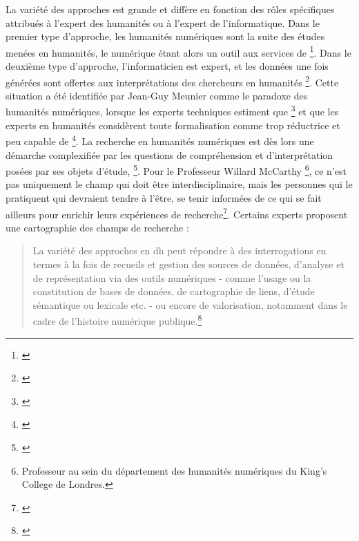 La variété des approches est grande et diffère en fonction des rôles spécifiques attribués à l'expert des humanités ou à l'expert de l'informatique. Dans le premier type d'approche, les humanités numériques sont la suite des études menées en humanités, le numérique étant alors un outil aux services de \textit{}\footnote{\cite[p.17]{schreibman_new_2016}}. Dans le deuxième type d'approche, l'informaticien est expert, et les données une fois générées sont offertes aux interprétations des chercheurs en humanités \footnote{\cite{meunier_paradoxe_2019}}. Cette situation a été identifiée par Jean-Guy Meunier comme le paradoxe des humanités numériques, lorsque les experts techniques estiment que \footnote{\cite[p.6]{meunier_paradoxe_2019}} et que les experts en humanités considèrent toute formalisation comme trop réductrice et peu capable de  \footnote{\cite[p.6]{meunier_paradoxe_2019}}. La recherche en humanités numériques est dès lors une démarche complexifiée par les questions de compréhension et d'interprétation posées par ses objets d'étude, \footnote{\cite[p.41]{clavert_les_2019}}. Pour le Professeur Willard McCarthy \footnote{Professeur au sein du département des humanités numériques du King's College de Londres.}, ce n'est pas uniquement le champ qui doit être interdisciplinaire, mais les personnes qui le pratiquent qui devraient tendre à l'être, se tenir informées de ce qui se fait ailleurs pour enrichir leurs expériences de recherche\footnote{\cite{schreibman_new_2016}}. Certains experts proposent une cartographie des champs de recherche : 

\begin{quotation}La variété des approches en \gls{dh} peut répondre à des interrogations en termes à la fois de recueils et gestion des sources de données, d'analyse et de représentation via des outils numériques - comme l'usage ou la constitution de bases de données, de cartographie de liens, d'étude sémantique ou lexicale etc. - ou encore de valorisation, notamment dans le cadre de l'histoire numérique publique.\footnote{\cite[p.35-36]{clavert_les_2019}}\end{quotation}

